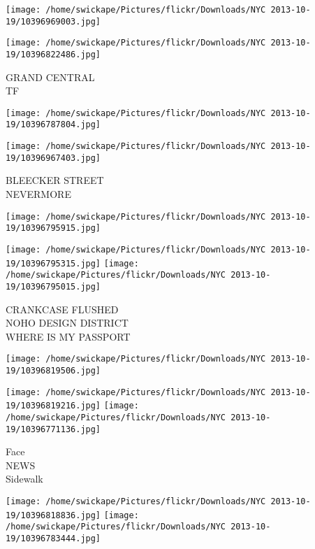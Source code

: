 \documentclass[10pt,letterpaper]{article}
\begin{document}
\texttt{[image: /home/swickape/Pictures/flickr/Downloads/NYC 2013-10-19/10396969003.jpg]}

\vspace{0.25in}
\texttt{[image: /home/swickape/Pictures/flickr/Downloads/NYC 2013-10-19/10396822486.jpg]}

GRAND CENTRAL\\
TF\\
\pagebreak

\texttt{[image: /home/swickape/Pictures/flickr/Downloads/NYC 2013-10-19/10396787804.jpg]}

\vspace{0.25in}
\texttt{[image: /home/swickape/Pictures/flickr/Downloads/NYC 2013-10-19/10396967403.jpg]}

BLEECKER STREET\\
NEVERMORE\\
\pagebreak

\texttt{[image: /home/swickape/Pictures/flickr/Downloads/NYC 2013-10-19/10396795915.jpg]}

\vspace{0.25in}
\texttt{[image: /home/swickape/Pictures/flickr/Downloads/NYC 2013-10-19/10396795315.jpg]}
\texttt{[image: /home/swickape/Pictures/flickr/Downloads/NYC 2013-10-19/10396795015.jpg]}

CRANKCASE FLUSHED\\
NOHO DESIGN DISTRICT\\
WHERE IS MY PASSPORT\\
\pagebreak

\texttt{[image: /home/swickape/Pictures/flickr/Downloads/NYC 2013-10-19/10396819506.jpg]}

\vspace{0.25in}
\texttt{[image: /home/swickape/Pictures/flickr/Downloads/NYC 2013-10-19/10396819216.jpg]}
\texttt{[image: /home/swickape/Pictures/flickr/Downloads/NYC 2013-10-19/10396771136.jpg]}

Face\\
NEWS\\
Sidewalk\\
\pagebreak

\texttt{[image: /home/swickape/Pictures/flickr/Downloads/NYC 2013-10-19/10396818836.jpg]}
\texttt{[image: /home/swickape/Pictures/flickr/Downloads/NYC 2013-10-19/10396783444.jpg]}
\end{document}
